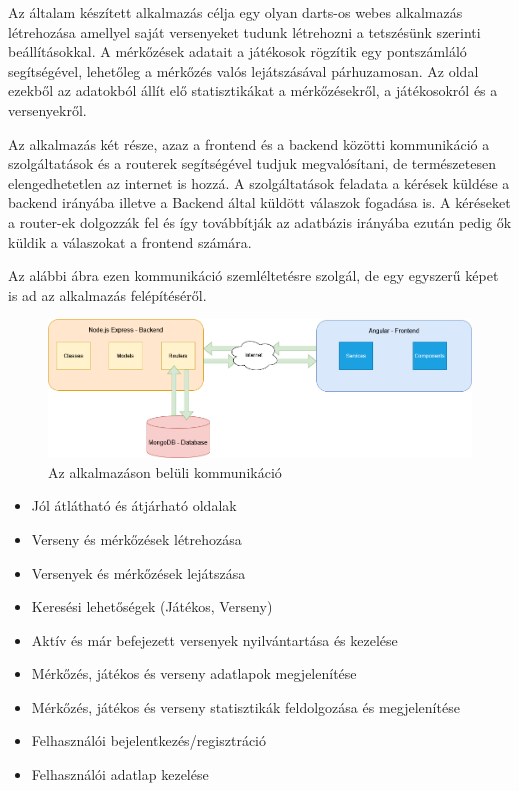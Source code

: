 
Az általam készített alkalmazás célja egy olyan darts-os webes alkalmazás létrehozása amellyel saját versenyeket tudunk létrehozni a tetszésünk szerinti beállításokkal. A mérkőzések adatait a játékosok rögzítik egy pontszámláló segítségével, lehetőleg a mérkőzés valós lejátszásával párhuzamosan. Az oldal ezekből az adatokból állít elő statisztikákat a mérkőzésekről, a játékosokról és a versenyekről.

Az alkalmazás két része, azaz a frontend és a backend közötti kommunikáció a szolgáltatások és a routerek segítségével tudjuk megvalósítani, de természetesen elengedhetetlen az internet is hozzá. A szolgáltatások feladata a kérések küldése a backend irányába illetve a Backend által küldött válaszok fogadása is. A kéréseket a router-ek dolgozzák fel és így továbbítják az adatbázis irányába ezután pedig ők küldik a válaszokat a frontend számára.

Az alábbi ábra ezen kommunikáció szemléltetésre szolgál, de egy egyszerű képet is ad az alkalmazás felépítéséről.

\begin{figure}[h]
\centering
\includegraphics[scale=0.3]{images/DoubleOut_Network.drawio.png}
\caption{Az alkalmazáson belüli kommunikáció}
\label{fig:cimer}
\end{figure}

\begin{itemize}
\item Jól átlátható és átjárható oldalak
\item Verseny és mérkőzések létrehozása
\item Versenyek és mérkőzések lejátszása
\item Keresési lehetőségek (Játékos, Verseny)
\item Aktív és már befejezett versenyek nyilvántartása és kezelése
\item Mérkőzés, játékos és verseny adatlapok megjelenítése
\item Mérkőzés, játékos és verseny statisztikák feldolgozása és megjelenítése
\item Felhasználói bejelentkezés/regisztráció
\item Felhasználói adatlap kezelése

\end{itemize}

